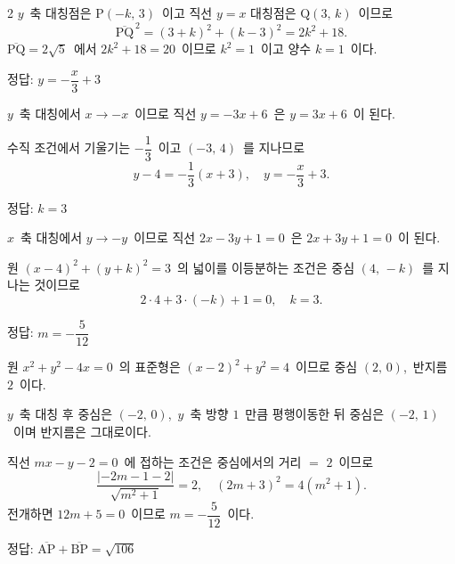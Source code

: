\documentclass[10pt,fleqn]{article}
\begin{document}
\begin{multicols*}{2}
$y$\ 축 대칭점은 $\mathrm{P}(-k,\, 3)$\ 이고 직선 $y = x$ 대칭점은 $\mathrm{Q}(3,\, k)$\ 이므로
\[ \overline{\mathrm{PQ}}^{\,2} = (3 + k)^2 + (k - 3)^2 = 2k^2 + 18. \]
$\overline{\mathrm{PQ}} = 2\sqrt{5}$\ 에서 $2k^2 + 18 = 20$\ 이므로 $k^2 = 1$\ 이고 양수 $k = 1$\ 이다.

\begin{dmanswerbox}
정답: $y=-\dfrac{x}{3}+3$
\end{dmanswerbox}

$y$\ 축 대칭에서 $x \to -x$\ 이므로 직선 $y = -3x + 6$\ 은 $y = 3x + 6$\ 이 된다.

수직 조건에서 기울기는 $-\dfrac{1}{3}$\ 이고 $(-3,\, 4)$\ 를 지나므로
\[ y - 4 = -\dfrac{1}{3}(x + 3),\quad y = -\dfrac{x}{3} + 3. \]

\begin{dmanswerbox}
정답: $k=3$
\end{dmanswerbox}

$x$\ 축 대칭에서 $y \to -y$\ 이므로 직선 $2x - 3y + 1 = 0$\ 은 $2x + 3y + 1 = 0$\ 이 된다.

원 $(x - 4)^2 + (y + k)^2 = 3$\ 의 넓이를 이등분하는 조건은 중심 $(4,\, -k)$\ 를 지나는 것이므로
\[ 2 \cdot 4 + 3 \cdot (-k) + 1 = 0,\quad k = 3. \]

\begin{dmanswerbox}
정답: $m=-\dfrac{5}{12}$
\end{dmanswerbox}

원 $x^2 + y^2 - 4x = 0$\ 의 표준형은 $(x - 2)^2 + y^2 = 4$\ 이므로 중심 $(2,\, 0)$,\ 반지름 $2$\ 이다.

$y$\ 축 대칭 후 중심은 $(-2,\, 0)$,\ $y$\ 축 방향 $1$\ 만큼 평행이동한 뒤 중심은 $(-2,\, 1)$\ 이며 반지름은 그대로이다.

직선 $mx - y - 2 = 0$\ 에 접하는 조건은 중심에서의 거리 $=$ $2$\ 이므로
\[ \dfrac{|{-2m - 1 - 2}|}{\sqrt{m^2 + 1}} = 2,\quad (2m + 3)^2 = 4(m^2 + 1). \]
전개하면 $12m + 5 = 0$\ 이므로 $m = -\dfrac{5}{12}$\ 이다.

\begin{dmanswerbox}
정답: $\overline{\mathrm{AP}}+\overline{\mathrm{BP}}=\sqrt{106}$
\end{dmanswerbox}


\end{multicols*}
\end{document}
